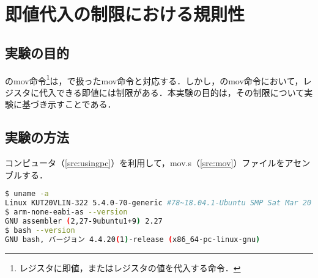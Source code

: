 \chapter*{即値代入の制限における規則性}
\section{実験の目的}
\aasm の{\ttfamily mov}命令\footnote{レジスタに即値，またはレジスタの値を代入する命令．}は，\iasm で扱った{\ttfamily mov}命令と対応する．しかし，\aasm の{\ttfamily mov}命令において，レジスタに代入できる即値には制限がある．本実験の目的は，その制限について実験に基づき示すことである．\par
\section{実験の方法}
コンピュータ（\ref{src:usingpc}）を利用して，{\ttfamily mov.s}（\ref{src:mov}）ファイルをアセンブルする．
\begin{lstlisting}[caption={利用コンピュータ及び実行環境},label={src:usingpc},language={Bash},numbers={none},breakindent={0pt}]
$ uname -a
Linux KUT20VLIN-322 5.4.0-70-generic #78~18.04.1-Ubuntu SMP Sat Mar 20 14:10:07 UTC 2021 x86_64 x86_64 x86_64 GNU/Linux
$ arm-none-eabi-as --version
GNU assembler (2,27-9ubuntu1+9) 2.27
$ bash --version
GNU bash, バージョン 4.4.20(1)-release (x86_64-pc-linux-gnu)
\end{lstlisting}
